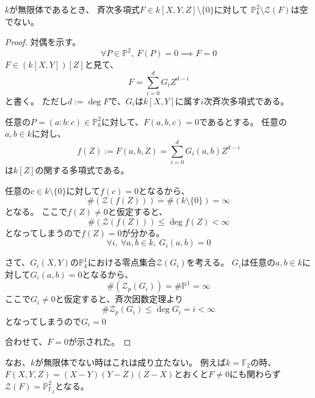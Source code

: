 \documentclass[a4]{article}
\newcommand{\proj}{\mathbb{P}}
\begin{document}
        \begin{Lemma}
            $k$が無限体であるとき、
            斉次多項式$F \in k[X,Y,Z] \setminus \{0\}$に対して
            $\proj^2_{k} \setminus \mathcal{Z}(F)$は空でない。
        \end{Lemma}
        \begin{proof}
            対偶を示す。
            \[ \forall P \in \proj^2,~ F(P)=0 \implies F=0 \]
            $F \in (k[X,Y])[Z]$と見て、
            \[ F=\sum_{i=0}^{d}{G_i Z^{d-i}} \]
            と書く。
            ただし$d:=\deg F$で、$G_i$は$k[X,Y]$に属す$i$次斉次多項式である。

            任意の$P=(a:b:c) \in \proj^2_{k}$に対して、$F(a,b,c)=0$であるとする。
            任意の$a,b \in k$に対し、
            \[f(Z):=F(a,b,Z)=\sum_{i=0}^{d}{G_i(a,b) Z^{d-i}}\]
            は$k[Z]$の関する多項式である。

            任意の$c \in k \setminus \{0\}$に対して$f(c)=0$となるから、
            \[ \#(\mathcal{Z}(f(Z)))=\#(k \setminus \{0\})=\infty \]
            となる。
            ここで$f(Z) \neq 0$と仮定すると、
            \[ \#(\mathcal{Z}(f(Z))) \leq \deg f(Z) < \infty \]
            となってしまうので$f(Z)=0$が分かる。
            \[ \forall i,~ \forall a, b \in k,~ G_i(a,b)=0 \]

            さて、$G_i(X,Y)$の$\proj^1_{k}$における零点集合$\mathcal{Z}(G_i)$を考える。
            $G_i$は任意の$a,b \in k$に対して$G_i(a,b)=0$となるから、
            \[ \#(\mathcal{Z}_p(G_i))=\# \proj^1=\infty \]
            ここで$G_i \neq 0$と仮定すると、斉次因数定理より
            \[ \#\mathcal{Z}_p(G_i) \leq \deg G_i=i< \infty \]
            となってしまうので$G_i=0$

            合わせて、$F=0$が示された。
            
        \end{proof}
        なお、$k$が無限体でない時はこれは成り立たない。
        例えば$k=\mathbb{F}_2$の時、
        $F(X,Y,Z)=(X-Y)(Y-Z)(Z-X)$とおくと$F \neq 0$にも関わらず
        $\mathcal{Z}(F)=\proj^2_{\mathbb{F}_2}$となる。
\end{document}
